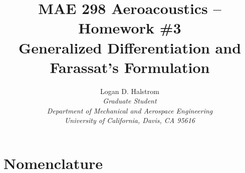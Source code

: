 \documentclass[]{aiaa-tc}%
\title{MAE 298 Aeroacoustics -- Homework \#3 \\ Generalized Differentiation and Farassat's Formulation}
\author{
  Logan D. Halstrom \\
  {\normalsize\itshape Graduate Student} \\
  {\normalsize\itshape Department of Mechanical and Aerospace Engineering} \\
  {\normalsize\itshape University of California, Davis, CA 95616}
       }
\begin{document}
\maketitle




\section*{Nomenclature}

\begin{multicols}{2}


\end{multicols}
\end{document}
